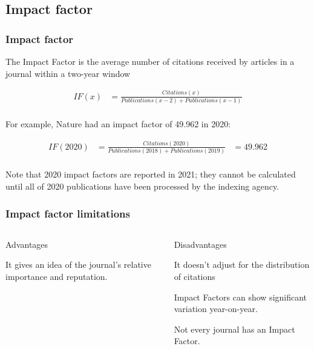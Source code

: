 \documentclass{beamer}
\begin{document}
\subsection{Impact factor}
\begin{frame}
    \frametitle{Impact factor}
    The Impact Factor is the average number of citations received by articles in a journal within a two-year window
    
    \begin{align*}
        IF(x) &= \frac{ Citations(x)}{ Publications(x - 2 ) +  Publications(x - 1) }\\
    \end{align*}

    For example, Nature had an impact factor of 49.962 in 2020:
    
    \begin{align*}
        IF(2020) &= \frac{ Citations(2020)}{ Publications(2018) +  Publications(2019) } &= 49.962\\
    \end{align*}

    Note that 2020 impact factors are reported in 2021; they cannot be calculated until all of 2020
    publications have been processed by the indexing agency.

\end{frame}
\begin{frame}
    \frametitle{Impact factor limitations}
    \begin{columns}[T]
        \begin{column}{.5\textwidth} \pause
            \centering Advantages
            \begin{propslist}
                \item It gives an idea of the journal’s relative importance and reputation. \pause
            \end{propslist}
        \end{column}
        \begin{column}{.5\textwidth}
            \centering Disadvantages %
            \begin{conslist}
                \item It doesn’t adjust for the distribution of citations \pause
                \item Impact Factors can show significant variation year-on-year.  \pause
                \item Not every journal has an Impact Factor.  \pause
            \end{conslist}
        \end{column}
    \end{columns}
\end{frame}
\end{document}
